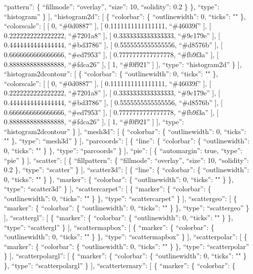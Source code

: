 \documentclass[
]{article}
\begin{document}
``pattern'': \{ ``fillmode'': ``overlay'', ``size'': 10, ``solidity'':
0.2 \} \}, ``type'': ``histogram'' \} {]}, ``histogram2d'': {[} \{
``colorbar'': \{ ``outlinewidth'': 0, ``ticks'': "" \}, ``colorscale'':
{[} {[} 0, ``\#0d0887'' {]}, {[} 0.1111111111111111, ``\#46039f'' {]},
{[} 0.2222222222222222, ``\#7201a8'' {]}, {[} 0.3333333333333333,
``\#9c179e'' {]}, {[} 0.4444444444444444, ``\#bd3786'' {]}, {[}
0.5555555555555556, ``\#d8576b'' {]}, {[} 0.6666666666666666,
``\#ed7953'' {]}, {[} 0.7777777777777778, ``\#fb9f3a'' {]}, {[}
0.8888888888888888, ``\#fdca26'' {]}, {[} 1, ``\#f0f921'' {]} {]},
``type'': ``histogram2d'' \} {]}, ``histogram2dcontour'': {[} \{
``colorbar'': \{ ``outlinewidth'': 0, ``ticks'': "" \}, ``colorscale'':
{[} {[} 0, ``\#0d0887'' {]}, {[} 0.1111111111111111, ``\#46039f'' {]},
{[} 0.2222222222222222, ``\#7201a8'' {]}, {[} 0.3333333333333333,
``\#9c179e'' {]}, {[} 0.4444444444444444, ``\#bd3786'' {]}, {[}
0.5555555555555556, ``\#d8576b'' {]}, {[} 0.6666666666666666,
``\#ed7953'' {]}, {[} 0.7777777777777778, ``\#fb9f3a'' {]}, {[}
0.8888888888888888, ``\#fdca26'' {]}, {[} 1, ``\#f0f921'' {]} {]},
``type'': ``histogram2dcontour'' \} {]}, ``mesh3d'': {[} \{
``colorbar'': \{ ``outlinewidth'': 0, ``ticks'': "" \}, ``type'':
``mesh3d'' \} {]}, ``parcoords'': {[} \{ ``line'': \{ ``colorbar'': \{
``outlinewidth'': 0, ``ticks'': "" \} \}, ``type'': ``parcoords'' \}
{]}, ``pie'': {[} \{ ``automargin'': true, ``type'': ``pie'' \} {]},
``scatter'': {[} \{ ``fillpattern'': \{ ``fillmode'': ``overlay'',
``size'': 10, ``solidity'': 0.2 \}, ``type'': ``scatter'' \} {]},
``scatter3d'': {[} \{ ``line'': \{ ``colorbar'': \{ ``outlinewidth'': 0,
``ticks'': "" \} \}, ``marker'': \{ ``colorbar'': \{ ``outlinewidth'':
0, ``ticks'': "" \} \}, ``type'': ``scatter3d'' \} {]},
``scattercarpet'': {[} \{ ``marker'': \{ ``colorbar'': \{
``outlinewidth'': 0, ``ticks'': "" \} \}, ``type'': ``scattercarpet'' \}
{]}, ``scattergeo'': {[} \{ ``marker'': \{ ``colorbar'': \{
``outlinewidth'': 0, ``ticks'': "" \} \}, ``type'': ``scattergeo'' \}
{]}, ``scattergl'': {[} \{ ``marker'': \{ ``colorbar'': \{
``outlinewidth'': 0, ``ticks'': "" \} \}, ``type'': ``scattergl'' \}
{]}, ``scattermapbox'': {[} \{ ``marker'': \{ ``colorbar'': \{
``outlinewidth'': 0, ``ticks'': "" \} \}, ``type'': ``scattermapbox'' \}
{]}, ``scatterpolar'': {[} \{ ``marker'': \{ ``colorbar'': \{
``outlinewidth'': 0, ``ticks'': "" \} \}, ``type'': ``scatterpolar'' \}
{]}, ``scatterpolargl'': {[} \{ ``marker'': \{ ``colorbar'': \{
``outlinewidth'': 0, ``ticks'': "" \} \}, ``type'': ``scatterpolargl''
\} {]}, ``scatterternary'': {[} \{ ``marker'': \{ ``colorbar'': \{
\end{document}
